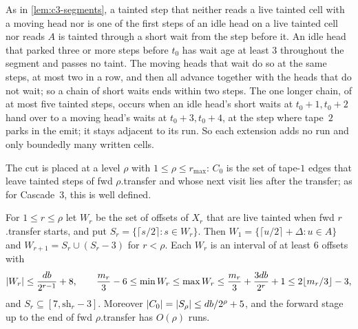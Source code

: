 \begin{informalproof}
As in \cref{lem:c3-segments}, a tainted step that neither reads a live tainted cell with a moving head nor is one of the first steps
of an idle head on a live tainted cell nor reads $A$ is tainted through a short wait from the step before it. An idle head that parked
three or more steps before $t_0$ has wait age at least $3$ throughout the segment and passes no taint. The moving heads that wait do so
at the same steps, at most two in a row, and then all advance together with the heads that do not wait; so a chain of short waits ends
within two steps. The one longer chain, of at most five tainted steps, occurs when an idle head's short waits at $t_0+1,t_0+2$ hand over
to a moving head's waits at $t_0+3,t_0+4$, at the step where tape~$2$ parks in the emit; it stays adjacent to its run. So each extension
adds no run and only boundedly many written cells.
\end{informalproof}

The cut is placed at a level $\rho$ with $1\le\rho\le r_{\max}$: $C_0$ is the set of tape-$1$ edges that leave tainted steps of
fwd $\rho$.transfer and whose next visit lies after the transfer; as for Cascade~3, this is well defined.

\begin{lemma}\label{lem:c4-forward}
\notformalized
For $1\le r\le\rho$ let $W_r$ be the set of offsets of $X_r$ that are live tainted when fwd $r$.transfer starts, and put
$S_r=\{\lceil s/2\rceil:s\in W_r\}$. Then $W_1=\{\lceil u/2\rceil+\Delta:u\in A\}$ and $W_{r+1}=S_r\cup(S_r-3)$ for $r<\rho$. Each $W_r$
is an interval of at least $6$ offsets with
\[
  \lvert W_r \rvert\le\frac{db}{2^{r-1}}+8,\qquad \frac{m_r}3-6\le\min W_r\le\max W_r\le\frac{m_r}3+\frac{3db}{2^r}+1\le2\lfloor m_r/3\rfloor-3 ,
\]
and $S_r\subseteq[7,\mathrm{sh}_r-3]$. Moreover $\lvert C_0 \rvert=\lvert S_\rho \rvert\le db/2^\rho+5$, and the forward stage up to the end of
fwd $\rho$.transfer has $O(\rho)$ runs.
\end{lemma}

